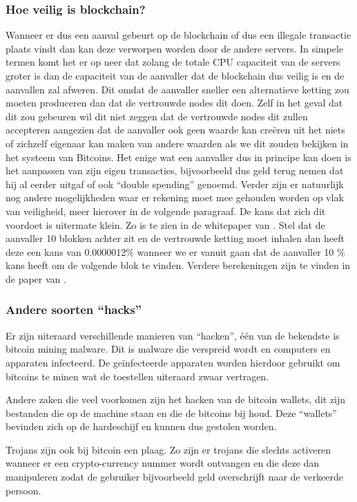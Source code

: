 \subsubsection{Hoe veilig is blockchain?}
\label{sec:hoeveiligisblockchain}
Wanneer er dus een aanval gebeurt op de blockchain of dus een illegale transactie plaats vindt dan kan deze verworpen worden door de andere servers. In simpele termen komt het er op neer dat zolang de totale CPU capaciteit van de servers groter is dan de capaciteit van de aanvaller dat de blockchain dus veilig is en de aanvallen zal afweren. Dit omdat de aanvaller sneller een alternatieve ketting zou moeten produceren  dan dat de vertrouwde nodes dit doen. Zelf in het geval dat dit zou gebeuren wil dit niet zeggen dat de vertrouwde nodes dit zullen accepteren aangezien dat de aanvaller ook geen waarde kan creëren uit het niets of zichzelf eigenaar kan maken van andere waarden als we dit zouden bekijken in het systeem van Bitcoins. Het enige wat een aanvaller dus in principe kan doen is het aanpassen van zijn eigen transacties, bijvoorbeeld dus geld terug nemen dat hij al eerder uitgaf of ook ``double spending'' genoemd. Verder zijn er natuurlijk nog andere mogelijkheden waar er rekening moet mee gehouden worden op vlak van veiligheid, meer hierover in de volgende paragraaf. De kans dat zich dit voordoet is uitermate klein. Zo is te zien in de whitepaper van \textcite{Nakamoto2008}. Stel dat de aanvaller 10 blokken achter zit en de vertrouwde ketting moet inhalen dan heeft deze een kans van 0.0000012\% wanneer we er vanuit gaan dat de aanvaller 10 \% kans heeft om de volgende blok te vinden. Verdere berekeningen zijn te vinden in de paper van \autocite{Nakamoto2008}.


\subsubsection{Andere soorten ``hacks''}
Er zijn uiteraard verschillende manieren van ``hacken'', één van de bekendste is bitcoin mining malware. Dit is malware die verspreid wordt en computers en apparaten infecteerd. De geïnfecteerde apparaten worden hierdoor gebruikt om bitcoins te minen wat de toestellen uiteraard zwaar vertragen. 

Andere zaken die veel voorkomen zijn het hacken van de bitcoin wallets, dit zijn bestanden die op de machine staan en die de bitcoins bij houd. Deze ``wallets'' bevinden zich op de hardeschijf en kunnen dus gestolen worden. 

Trojans zijn ook bij bitcoin een plaag. Zo zijn er trojans die slechts activeren wanneer er een crypto-currency nummer wordt ontvangen en die deze dan manipuleren zodat de gebruiker bijvoorbeeld geld overschrijft naar de verkeerde persoon. 

